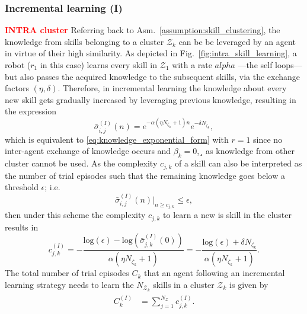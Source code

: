 \subsubsection{\textbf{Incremental learning (I)}}
\textcolor{red}{\textbf{INTRA cluster}}
Referring back to Asm.~\ref{assumption:skill_clustering}, the knowledge from skills belonging to a cluster ${\mathcal{Z}_k}$ can be be leveraged by an agent in virtue of their high similarity. As depicted in Fig.~\ref{fig:intra_skill_learning}, a robot ($r_1$ in this case) learns every skill in $\mathcal{Z}_1$ with a rate $alpha$ ---the self loops--- but also passes the acquired knowledge to the subsequent skills, via the exchange factors $(\eta,\delta)$. Therefore, in incremental learning the knowledge about every new skill gets gradually increased by leveraging previous knowledge, resulting in the expression
\begin{equation*}\label{eq:remaining_knowledge__IL}
	\bar{\sigma}^{(I)}_{i,j}(n) = e^{-\alpha  \left(\eta N_{\zeta_k}+1\right) n} e^{-\delta N_{\zeta_k}},
\end{equation*}
which is equivalent to \eqref{eq:knowledge_exponential_form} with $r=1$ since no inter-agent exchange of knowledge occurs and $\beta_k = 0$,¸ as knowledge from other cluster cannot be used. As the complexity $c_{j,k}$ of a skill can also be interpreted as the number of trial episodes such that the remaining knowledge goes below a threshold $\epsilon$; i.e.
\begin{equation*}
	\bar{\sigma}^{(I)}_{i,j}(n) \rvert_{n \ge c_{j,k}} \leq \epsilon,
\end{equation*}
then under this scheme the complexity $c_{j,k}$ to learn a new is skill in the cluster results in
\begin{equation}\label{eq:complexity_IL}
	c^{(I)}_{j,k} = -\frac{\text{log}(\epsilon) - \text{log}(\bar{\sigma}^{(I)}_{j,k}(0))}{\alpha (\eta N_{\zeta_k}+ 1)} = -\frac{\text{log}(\epsilon) + \delta N_{\zeta_k}}{\alpha (\eta N_{\zeta_k}+ 1)}  .
\end{equation}
The total number of trial episodes $ C_k $ that an agent following an incremental learning strategy needs to learn the $N_{\mathcal{Z}_k}$ skills in a cluster $ \mathcal{Z}_k $ is given by
\begin{align}\label{eq:total_episodes_incremental}
	\begin{split}
		C^{(I)}_k &= \sum^{N_{\mathcal{Z}}}_{j=1} c^{(I)}_{j,k}.
	\end{split}
\end{align}

